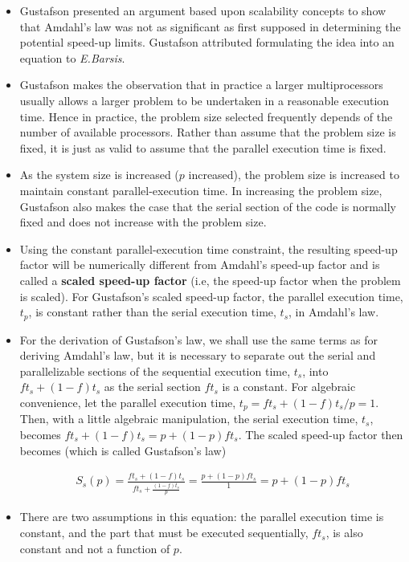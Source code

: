 \documentclass[a4paper]{article}
\begin{document}
\begin{itemize}
\item Gustafson presented an argument based upon scalability concepts to show that Amdahl's law was not as significant as first supposed in determining the potential speed-up limits. Gustafson attributed formulating the idea into an equation to \emph{E.Barsis}.

\item Gustafson makes the observation that in practice a larger multiprocessors usually allows a larger problem to be undertaken in a reasonable execution time. Hence in practice, the problem size selected frequently depends of the number of available processors. Rather than assume that the problem size is fixed, it is just as valid to assume that the parallel execution time is fixed. 

\item As the system size is increased ($p$ increased), the problem size is increased to maintain constant parallel-execution time. In increasing the problem size, Gustafson also makes the case that the serial section of the code is normally fixed and does not increase with the problem size.

\item Using the constant parallel-execution time constraint, the resulting speed-up factor will be numerically different from Amdahl's speed-up factor and is called a \textbf{scaled speed-up factor} (i.e, the speed-up factor when the problem is scaled). For Gustafson's scaled speed-up factor, the parallel execution time, $t_p$, is constant rather than the serial execution time, $t_s$, in Amdahl's law.

\item For the derivation of Gustafson's law, we shall use the same terms as for deriving Amdahl's law, but it is necessary to separate out the serial and parallelizable sections of the sequential execution time, $t_s$, into $ft_s + (1 - f)t_s$ as the serial section $ft_s$ is a constant. For algebraic convenience, let the parallel execution time, $t_p = ft_s + (1 - f) t_s/p = 1$. Then, with a little algebraic manipulation, the serial execution time, $t_s$, becomes $ft_s + (1 - f)t_s = p + (1 - p)ft_s$. The scaled speed-up factor then becomes (which is called Gustafson's law)

\begin{large}
\begin{align*}
S_s(p) = \frac{ft_s + (1 - f)t_s}{ft_s + \frac{(1 - f)t_s}{p}} = \frac{p + (1 - p)ft_s}{1} = p + (1 - p)ft_s
\end{align*}
\end{large}

\item There are two assumptions in this equation: the parallel execution time is constant, and the part that must be executed sequentially, $ft_s$, is also constant and not a function of $p$. 
\end{itemize}
\end{document}
